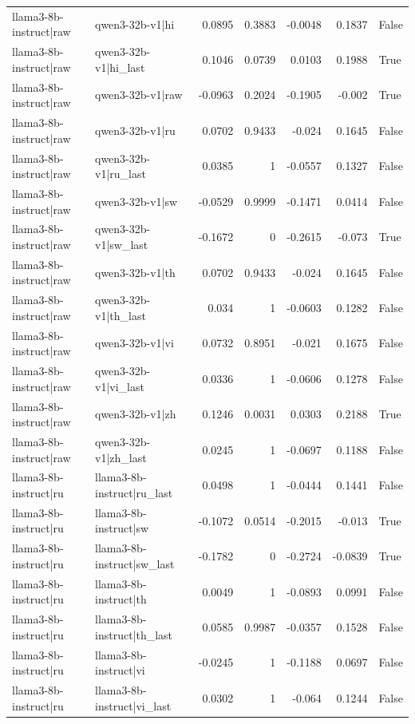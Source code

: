 \begin{table}
\begin{tabular}{l l r r r r l}
llama3-8b-instruct|raw & qwen3-32b-v1|hi & 0.0895 & 0.3883 & -0.0048 & 0.1837 & False \\
llama3-8b-instruct|raw & qwen3-32b-v1|hi_last & 0.1046 & 0.0739 & 0.0103 & 0.1988 & True \\
llama3-8b-instruct|raw & qwen3-32b-v1|raw & -0.0963 & 0.2024 & -0.1905 & -0.002 & True \\
llama3-8b-instruct|raw & qwen3-32b-v1|ru & 0.0702 & 0.9433 & -0.024 & 0.1645 & False \\
llama3-8b-instruct|raw & qwen3-32b-v1|ru_last & 0.0385 & 1 & -0.0557 & 0.1327 & False \\
llama3-8b-instruct|raw & qwen3-32b-v1|sw & -0.0529 & 0.9999 & -0.1471 & 0.0414 & False \\
llama3-8b-instruct|raw & qwen3-32b-v1|sw_last & -0.1672 & 0 & -0.2615 & -0.073 & True \\
llama3-8b-instruct|raw & qwen3-32b-v1|th & 0.0702 & 0.9433 & -0.024 & 0.1645 & False \\
llama3-8b-instruct|raw & qwen3-32b-v1|th_last & 0.034 & 1 & -0.0603 & 0.1282 & False \\
llama3-8b-instruct|raw & qwen3-32b-v1|vi & 0.0732 & 0.8951 & -0.021 & 0.1675 & False \\
llama3-8b-instruct|raw & qwen3-32b-v1|vi_last & 0.0336 & 1 & -0.0606 & 0.1278 & False \\
llama3-8b-instruct|raw & qwen3-32b-v1|zh & 0.1246 & 0.0031 & 0.0303 & 0.2188 & True \\
llama3-8b-instruct|raw & qwen3-32b-v1|zh_last & 0.0245 & 1 & -0.0697 & 0.1188 & False \\
llama3-8b-instruct|ru & llama3-8b-instruct|ru_last & 0.0498 & 1 & -0.0444 & 0.1441 & False \\
llama3-8b-instruct|ru & llama3-8b-instruct|sw & -0.1072 & 0.0514 & -0.2015 & -0.013 & True \\
llama3-8b-instruct|ru & llama3-8b-instruct|sw_last & -0.1782 & 0 & -0.2724 & -0.0839 & True \\
llama3-8b-instruct|ru & llama3-8b-instruct|th & 0.0049 & 1 & -0.0893 & 0.0991 & False \\
llama3-8b-instruct|ru & llama3-8b-instruct|th_last & 0.0585 & 0.9987 & -0.0357 & 0.1528 & False \\
llama3-8b-instruct|ru & llama3-8b-instruct|vi & -0.0245 & 1 & -0.1188 & 0.0697 & False \\
llama3-8b-instruct|ru & llama3-8b-instruct|vi_last & 0.0302 & 1 & -0.064 & 0.1244 & False \\

\end{tabular}
\end{table}
